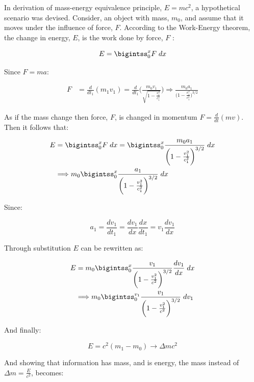 \documentclass[12pt]{article}
\begin{document}
In derivation of mass-energy equivalence principle, $E = mc^2$, a hypothetical scenario was devised. Consider, an object with mass, $m_0$, and assume that it moves under the influence of force, $F$. According to the Work-Energy theorem, the change in energy, $E$, is the work done by force, $F$ :

\begin{equation}
	E = \bigintss_{0}^{x} F\;dx
\end{equation}

Since $F = ma$: 

\begin{align*}
	F &= \frac{d}{dt_1} (m_1 v_1) = \frac{d}{dt_1} \Biggr ( \frac{m_0 v_1}{\sqrt{1 - \frac{v^2_1}{c^2_1}}} \Biggr ) \Longrightarrow \frac{m_0 a_1}{\Big (1 - \frac{v_1^2}{c_1^2}  \Big )^{3/2}}
\end{align*}

As if the mass change then force, $F$, is changed in momentum $F = \frac{d}{dt}(mv)$. Then it follows that:

\begin{align*}
	E &= \bigintss_{0}^{x} F\;dx = \bigintss_{0}^{x} \frac{m_0 a_1}{\bigg ( 1 - \frac{v_1^2}{c_1^2} \bigg )^{3/2}} \;dx \\
	&\Longrightarrow m_0 \bigintss_{0}^{x} \frac{a_1}{\bigg ( 1 - \frac{v_1^2}{c_1^2} \bigg )^{3/2}}\;dx
\end{align*}

Since:

\begin{equation*}
	a_1 = \frac{dv_1}{dt_1} = \frac{dv_1}{dx} \frac{dx}{dt_1} = v_1 \frac{dv_1}{dx}
\end{equation*}

Through substitution $E$ can be rewritten as:

\begin{align}
	E &= m_0 \bigintss_{0}^{x} \frac{v_1}{\bigg ( 1 - \frac{v_1^2}{c^2} \bigg )^{3/2}} \frac{dv_1}{dx}\;dx \nonumber \\
	&\Longrightarrow m_0 \bigintss_{0}^{v_1} \frac{v_1}{\bigg ( 1 - \frac{v_1^2}{c^2} \bigg )^{3/2}}\;dv_1 \label{d:1}
\end{align}

And finally:

\begin{equation}
	E = c^2 (m_1 - m_0) \longrightarrow \Delta m c^2
\end{equation}

And showing that information has mass, and is energy, the mass instead of $\Delta m = \frac{E}{c^2}$, becomes:
\end{document}

